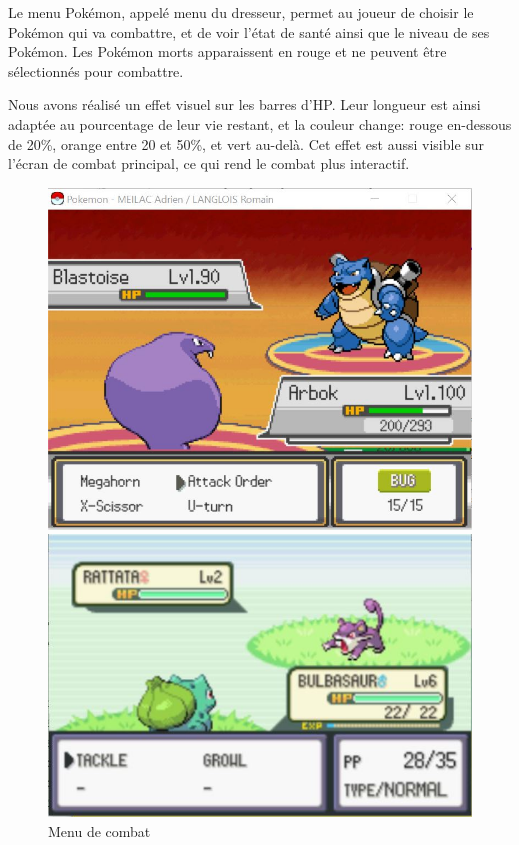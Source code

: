 Le menu Pokémon, appelé menu du dresseur, permet au joueur de choisir le Pokémon qui va combattre, et de voir l'état de santé ainsi que le niveau de ses Pokémon. Les Pokémon morts apparaissent en rouge et ne peuvent être sélectionnés pour combattre. 

Nous avons réalisé un effet visuel sur les barres d'HP. Leur longueur est ainsi adaptée au pourcentage de leur vie restant, et la couleur change: rouge en-dessous de 20\%, orange entre 20 et 50\%, et vert au-delà. Cet effet est aussi visible sur l'écran de combat principal, ce qui rend le combat plus interactif. 

\begin{figure}[!h]
\begin{minipage}{0.49\textwidth}
\includegraphics[scale = 0.6]{../Images/fightMenu.jpg}
\end{minipage}
\begin{minipage}{0.49\textwidth}
\includegraphics[scale = 0.84]{../Images/vrai_jeu_fightMenu.jpg}
\end{minipage}
\caption{Menu de combat}
\end{figure}



